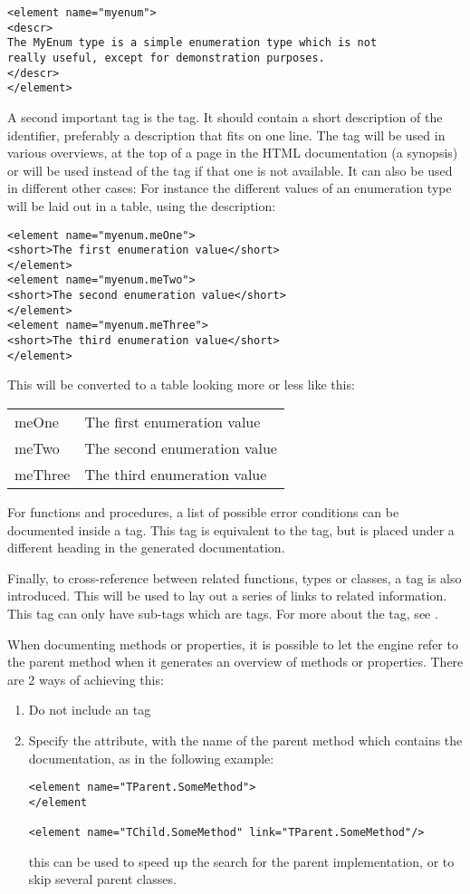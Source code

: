 \begin{verbatim}
<element name="myenum">
<descr>
The MyEnum type is a simple enumeration type which is not
really useful, except for demonstration purposes.
</descr>
</element>
\end{verbatim}

A second important tag is the  tag. It should contain a 
short description of the identifier, preferably a description that fits on
one line. The  tag will be used in
various overviews, at the top of a page in the HTML documentation (a
synopsis) or will be used instead of the  tag if that one 
is not available. It can also be used in different other cases: For 
instance the different values of an enumeration type will be laid 
out in a table, using the  description:
\begin{verbatim}
<element name="myenum.meOne">
<short>The first enumeration value</short>
</element>
<element name="myenum.meTwo">
<short>The second enumeration value</short>
</element>
<element name="myenum.meThree">
<short>The third enumeration value</short>
</element>
\end{verbatim}
This will be converted to a table looking more or less like this:

\begin{tabularx}{\textwidth}{lX}
meOne & The first enumeration value \\
meTwo & The second enumeration value \\
meThree & The third enumeration value \\
\end{tabularx}

For functions and procedures, a list of possible error conditions can be
documented inside a  tag. This tag is equivalent to the
 tag, but is placed under a different heading in the generated
documentation.

Finally, to cross-reference between related functions, types or classes, a
 tag is also introduced. This will be used to lay out a series
of links to related information. This tag can only have sub-tags which are
 tags. For more about the  tag, see .

When documenting methods or properties, it is possible to let the  engine
refer to the parent method when it generates an overview of methods or
properties. There are 2 ways of achieving this: 
\begin{enumerate}
\item Do not include an  tag
\item Specify the  attribute, with the name of the parent
method which contains the documentation, as in the following example:
\begin{verbatim}
<element name="TParent.SomeMethod">
</element

<element name="TChild.SomeMethod" link="TParent.SomeMethod"/>
\end{verbatim}
this can be used to speed up the search for the parent implementation,
or to skip several parent classes.
\end{enumerate}

